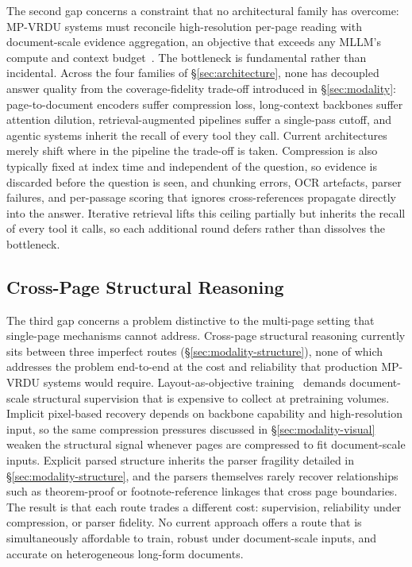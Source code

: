 \documentclass[11pt]{article}
\begin{document}
The second gap concerns a constraint that no architectural family has overcome: MP-VRDU systems must reconcile high-resolution per-page reading with document-scale evidence aggregation, an objective that exceeds any MLLM's compute and context budget~\cite{ma2024mmlongbenchdoc}. The bottleneck is fundamental rather than incidental. Across the four families of \S\ref{sec:architecture}, none has decoupled answer quality from the coverage-fidelity trade-off introduced in \S\ref{sec:modality}: page-to-document encoders suffer compression loss, long-context backbones suffer attention dilution, retrieval-augmented pipelines suffer a single-pass cutoff, and agentic systems inherit the recall of every tool they call. Current architectures merely shift where in the pipeline the trade-off is taken. Compression is also typically fixed at index time and independent of the question, so evidence is discarded before the question is seen, and chunking errors, OCR artefacts, parser failures, and per-passage scoring that ignores cross-references propagate directly into the answer. Iterative retrieval lifts this ceiling partially but inherits the recall of every tool it calls, so each additional round defers rather than dissolves the bottleneck.

\subsection{Cross-Page Structural Reasoning}
\label{sec:gap-structure}

The third gap concerns a problem distinctive to the multi-page setting that single-page mechanisms cannot address. Cross-page structural reasoning currently sits between three imperfect routes (\S\ref{sec:modality-structure}), none of which addresses the problem end-to-end at the cost and reliability that production MP-VRDU systems would require. Layout-as-objective training~\cite{hu2025mplugdocowl2,duan2025docopilot} demands document-scale structural supervision that is expensive to collect at pretraining volumes. Implicit pixel-based recovery depends on backbone capability and high-resolution input, so the same compression pressures discussed in \S\ref{sec:modality-visual} weaken the structural signal whenever pages are compressed to fit document-scale inputs. Explicit parsed structure inherits the parser fragility detailed in \S\ref{sec:modality-structure}, and the parsers themselves rarely recover relationships such as theorem-proof or footnote-reference linkages that cross page boundaries. The result is that each route trades a different cost: supervision, reliability under compression, or parser fidelity. No current approach offers a route that is simultaneously affordable to train, robust under document-scale inputs, and accurate on heterogeneous long-form documents.
\end{document}

